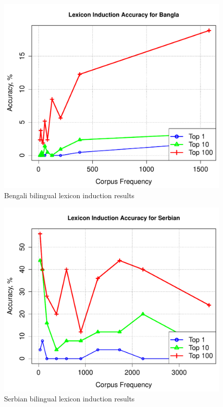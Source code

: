\documentclass[11pt]{article}
\begin{document}
\begin{figure}
\begin{center}
\includegraphics[width=0.9 \linewidth]{../byFreqGraphs/bn/lexinductnew.pdf}
\vskip -0.15in
\caption{Bengali bilingual lexicon induction results}
\label{fig:bli.bn} 
\end{center}
\end{figure}

\begin{figure}
\begin{center}
\includegraphics[width=0.9 \linewidth]{../byFreqGraphs/sr/lexinductnew.pdf}
\vskip -0.15in
\caption{Serbian bilingual lexicon induction results}
\label{fig:bli.sr} 
\end{center}
\end{figure}
\end{document}
